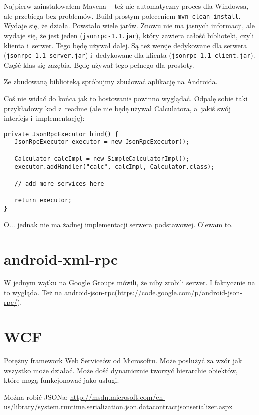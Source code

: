 Najpierw zainstalowałem Mavena -- też nie automatyczny proces dla Windowsa, ale przebiega bez problemów. Build prostym poleceniem \texttt{mvn~clean~install}. Wydaje się, że działa.
Powstało wiele jarów.
Znowu nie ma jasnych informacji, ale wydaje się, że jest jeden (\texttt{jsonrpc-1.1.jar}), który zawiera całość biblioteki, czyli klienta i~serwer. Tego będę używał dalej. Są też wersje dedykowane dla serwera (\texttt{jsonrpc-1.1-server.jar}) i~dedykowane dla klienta (\texttt{jsonrpc-1.1-client.jar}). Część klas się zazębia.
Będę używał tego pełnego dla prostoty.

Ze zbudowaną biblioteką spróbujmy zbudować aplikację na Androida.

Coś nie widać do końca jak to hostowanie powinno wyglądać. Odpalę sobie taki przykładowy kod z~readme (ale nie będę używał Calculatora, a~jakiś swój interfejs i~implementację):
\begin{lstlisting}[frame=single, caption={Przykładowy sposób wystawiania serwera bez użycia serwletów}, label=kod:bla]
private JsonRpcExecutor bind() {
   JsonRpcExecutor executor = new JsonRpcExecutor();

   Calculator calcImpl = new SimpleCalculatorImpl();
   executor.addHandler("calc", calcImpl, Calculator.class); 

   // add more services here

   return executor;
}
\end{lstlisting}

O... jednak nie ma żadnej implementacji serwera podstawowej. Olewam to.



\section{android-xml-rpc}
W jednym wątku na Google Groups \cite{android-rpc-thread} mówili, że niby zrobili serwer. I faktycznie na to wygląda.
Też na android-json-rpc(\url{https://code.google.com/p/android-json-rpc/}).



\section{WCF}
Potężny framework Web Serviceów od Microsoftu. Może posłużyć za wzór jak wszystko może działać. Może dość dynamicznie tworzyć hierarchie obiektów, które mogą funkcjonować jako usługi.

Można robić JSONa: \url{http://msdn.microsoft.com/en-us/library/system.runtime.serialization.json.datacontractjsonserializer.aspx}\\

